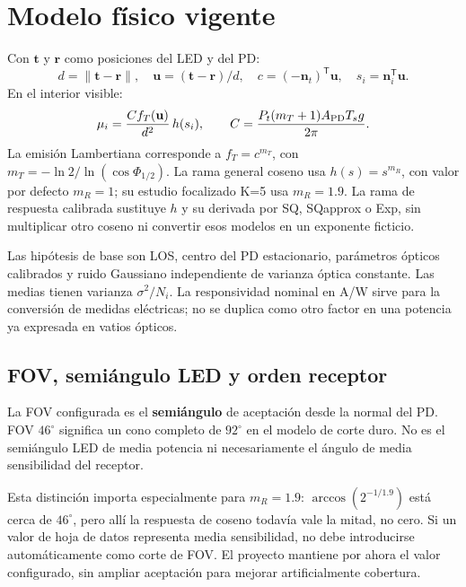 \documentclass[11pt,a4paper]{article}
\begin{document}
\section{Modelo físico vigente}
Con $\mathbf t$ y $\mathbf r$ como posiciones del LED y del PD:
\begin{equation}
 d=\|\mathbf t-\mathbf r\|,\quad \mathbf u=(\mathbf t-\mathbf r)/d,\quad
 c=(-\mathbf n_t)^{\mathsf T}\mathbf u,\quad s_i=\mathbf n_i^{\mathsf T}\mathbf u.
\end{equation}
En el interior visible:
\begin{equation}
 \mu_i=\frac{C f_T(\mathbf u)}{d^2}\,h(s_i),\qquad
 C=\frac{P_t(m_T+1)A_{\rm PD}T_sg}{2\pi}.
\end{equation}
La emisión Lambertiana corresponde a $f_T=c^{m_T}$, con $m_T=-\ln2/\ln(\cos\Phi_{1/2})$. La rama general coseno usa $h(s)=s^{m_R}$, con valor por defecto $m_R=1$; su estudio focalizado K=5 usa $m_R=1.9$. La rama de respuesta calibrada sustituye $h$ y su derivada por SQ, SQapprox o Exp, sin multiplicar otro coseno ni convertir esos modelos en un exponente ficticio.

Las hipótesis de base son LOS, centro del PD estacionario, parámetros ópticos calibrados y ruido Gaussiano independiente de varianza óptica constante. Las medias tienen varianza $\sigma^2/N_i$. La responsividad nominal en A/W sirve para la conversión de medidas eléctricas; no se duplica como otro factor en una potencia ya expresada en vatios ópticos.

\subsection{FOV, semiángulo LED y orden receptor}
La FOV configurada es el \textbf{semiángulo} de aceptación desde la normal del PD. FOV $46^\circ$ significa un cono completo de $92^\circ$ en el modelo de corte duro. No es el semiángulo LED de media potencia ni necesariamente el ángulo de media sensibilidad del receptor.

Esta distinción importa especialmente para $m_R=1.9$: $\arccos(2^{-1/1.9})$ está cerca de $46^\circ$, pero allí la respuesta de coseno todavía vale la mitad, no cero. Si un valor de hoja de datos representa media sensibilidad, no debe introducirse automáticamente como corte de FOV. El proyecto mantiene por ahora el valor configurado, sin ampliar aceptación para mejorar artificialmente cobertura.
\end{document}
